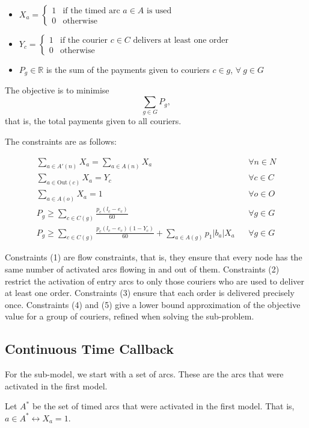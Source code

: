 \documentclass{article}
\begin{document}
\begin{itemize}
\item $X_a=\begin{cases}1&\text{if the timed arc }a\in A\text{ is used}\\0&\text{otherwise}\end{cases}$
\item $Y_c=\begin{cases}1&\text{if the courier }c\in C\text{ delivers at least one order}\\0&\text{otherwise}\end{cases}$
\item $P_g\in\mathbb R$ is the sum of the payments given to couriers $c\in g$, $\forall~g\in G$
\end{itemize}

The objective is to minimise $$\sum_{g\in G}P_g,$$ that is, the total payments given to all couriers.

The constraints are as follows:

\begin{align}
\sum_{a\in A'(n)}X_a=\sum_{a\in A(n)}X_a&&\forall n\in N\\
\sum_{a\in\text{Out}(c)}X_a=Y_c&&\forall c\in C\\
\sum_{a\in A(o)}X_a=1&&\forall o\in O\\
P_g\geq\sum_{c\in C(g)}\frac{p_c(l_c-e_c)}{60}&&\forall g\in G\\
P_g\geq\sum_{c\in C(g)}\frac{p_c(l_c-e_c)(1-Y_c)}{60} + \sum_{a\in A(g)}p_1|b_a|X_a&&\forall g\in G
\end{align}

Constraints (1) are flow constraints, that is, they ensure that every node has the same number of activated arcs flowing in and out of them.  Constraints (2) restrict the activation of entry arcs to only those couriers who are used to deliver at least one order. Constraints (3) ensure that each order is delivered precisely once. Constraints (4) and (5) give a lower bound approximation of the objective value for a group of couriers, refined when solving the sub-problem.

\subsection{Continuous Time Callback}

For the sub-model, we start with a set of arcs. These are the arcs that were activated in the first model.

Let $A^*$ be the set of timed arcs that were activated in the first model. That is, $a\in A^*\leftrightarrow X_a=1$.
\end{document}
